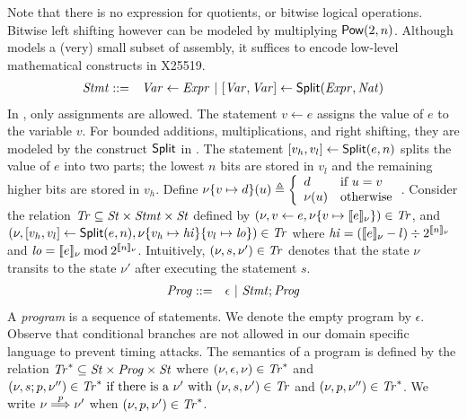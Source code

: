 Note that there is no expression for quotients, or bitwise logical
operations. Bitwise left shifting however can be modeled by
multiplying $\mbox{\textsf{Pow}}(2, n)$. Although \mydsl models a (very) 
small subset of assembly, it suffices to encode low-level
mathematical constructs in X25519.
\begin{eqnarray*}
  \mathit{Stmt} & ::= & \mathit{Var} \leftarrow \mathit{Expr}
            \ |\  {[}{\mathit{Var}}, {\mathit{Var}}{]} \leftarrow \mbox{\textsf{Split}} (\mathit{Expr}, \mathit{Nat})
\end{eqnarray*}
In \mydsl, only assignments are allowed.
The statement $v \leftarrow e$ assigns the value of $e$
to the variable $v$. For bounded additions, multiplications, and right
shifting, they are modeled by the construct $\mbox{\textsf{Split}}$ in \mydsl.
The statement ${[}{v_h}, {v_l}{]} \leftarrow
\mbox{\textsf{Split}}(e, n)$ splits the value of $e$ into two parts;
the lowest $n$ bits are stored in $v_l$ and the remaining higher bits
are stored in $v_h$. Define
$
\nu\{{v} \mapsto {d}\}(u) \triangleq
\left\{
   \begin{array}{ll}
     d & \textmd{if $u = v$}\\
     \nu(u) & \textmd{otherwise}
   \end{array}
\right.
$.
Consider the relation $\mathit{Tr} \subseteq \mathit{St} \times \mathit{Stmt} \times \mathit{St}$ defined
by $(\nu, v \leftarrow e, \nu\{{v} \mapsto {[\![{e}]\!]_{\nu}}\}) \in \mathit{Tr}$, and
  $(\nu, {[}{v_h}, {v_l}{]} \leftarrow \mbox{\textsf{Split}} (e, n), 
  \nu\{{v_h} \mapsto {\mathit{hi}}\}\{{v_l} \mapsto {\mathit{lo}}\}) \in \mathit{Tr}$
where
$\mathit{hi} = ([\![{e}]\!]_{\nu} - l) \div 2^{[\![{n}]\!]_{\nu}}$ and
$\mathit{lo} = [\![{e}]\!]_{\nu} \mathbin{\textmd{mod}} 2^{[\![{n}]\!]_{\nu}}$.
Intuitively, $(\nu, s, \nu') \in \mathit{Tr}$ denotes that the state $\nu$ transits to 
the state $\nu'$ after executing the statement $s$.
\begin{eqnarray*}
  \mathit{Prog} & ::= & \epsilon \ |\ \mathit{Stmt}; \mathit{Prog}
\end{eqnarray*}
A \emph{program} is a sequence of statements. We denote the empty program by 
$\epsilon$. Observe that conditional branches are not allowed in our
domain specific language to prevent timing attacks. The semantics of a
program is defined by the relation 
$\mathit{Tr}^* \subseteq \mathit{St} \times \mathit{Prog} \times \mathit{St}$ where
$(\nu, \epsilon, \nu) \in \mathit{Tr}^*$ and
$(\nu, s; p, \nu'') \in \mathit{Tr}^* \textmd{ if }
    \textmd{there is a } \nu' \textmd{ with }
    (\nu, s, \nu') \in \mathit{Tr}$ and
    $(\nu, p, \nu'') \in \mathit{Tr}^*$.
We write $\nu \overset{p}{\Longrightarrow} \nu'$ when $(\nu, p, \nu') \in \mathit{Tr}^*$.

